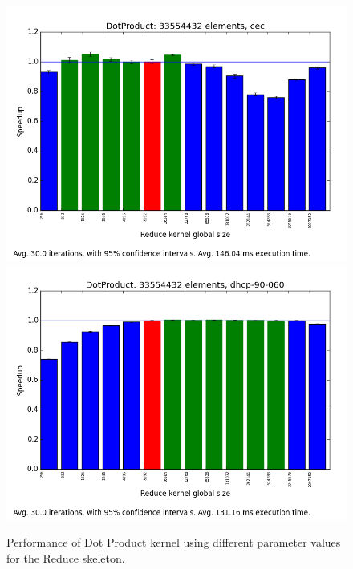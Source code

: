 \begin{figure}[h]
\includegraphics[width=\textwidth]{img/DotProduct-33554432-cec.png}
\includegraphics[width=\textwidth]{img/DotProduct-33554432-dhcp-90-060.png}
\caption{Performance of Dot Product kernel using different parameter
  values for the Reduce skeleton.} %
\label{fig:dp}
\end{figure}

